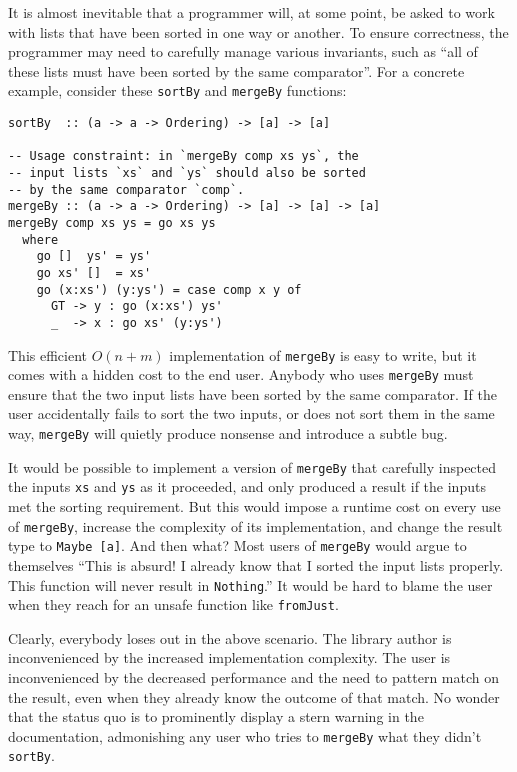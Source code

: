\documentclass[format=sigplan, review=false, screen=true, 10pt]{acmart}
\begin{document}
It is almost inevitable that a programmer will, at some point, be asked to work
with lists that have been sorted in one way or another. To ensure correctness,
the programmer may need to carefully manage various invariants, such
as ``all of these lists must have been sorted by the same comparator''. For a concrete
example, consider these \texttt{sortBy} and \texttt{mergeBy} functions:
\begin{verbatim}
sortBy  :: (a -> a -> Ordering) -> [a] -> [a]

-- Usage constraint: in `mergeBy comp xs ys`, the
-- input lists `xs` and `ys` should also be sorted
-- by the same comparator `comp`.
mergeBy :: (a -> a -> Ordering) -> [a] -> [a] -> [a]
mergeBy comp xs ys = go xs ys
  where
    go []  ys' = ys'
    go xs' []  = xs'
    go (x:xs') (y:ys') = case comp x y of
      GT -> y : go (x:xs') ys'
      _  -> x : go xs' (y:ys')
\end{verbatim}
This efficient $O(n+m)$ implementation of \texttt{mergeBy} is easy to write,
but it comes with a hidden cost to the end user. Anybody who uses \texttt{mergeBy}
must ensure that the two input lists have been sorted by the same comparator.
If the user accidentally fails to sort the two inputs, or does not sort them in the same way,
\texttt{mergeBy} will quietly produce nonsense and introduce a subtle bug.

It would be possible to implement a version of \texttt{mergeBy} that
carefully inspected the inputs \texttt{xs} and \texttt{ys} as it
proceeded, and only produced a result if the inputs met the sorting
requirement. But this would impose a runtime cost on every use of
\texttt{mergeBy}, increase the complexity of its implementation,
and change the result type to \texttt{Maybe [a]}. And then what?
Most users of \texttt{mergeBy} would argue to themselves ``This is
absurd! I already know that I sorted the input lists properly. This
function will never result in \texttt{Nothing}.'' It would be hard
to blame the user when they reach for an  unsafe function like
\texttt{fromJust}.

Clearly, everybody loses out in the above scenario. The
library author is inconvenienced by the increased implementation complexity.
The user is inconvenienced by the decreased performance and the need to
pattern match on the result, even when they  already know the
outcome of that match. No wonder that the status quo is to prominently display
a stern warning in the documentation, admonishing
any user who tries to \texttt{mergeBy} what they didn't \texttt{sortBy}.
\end{document}
